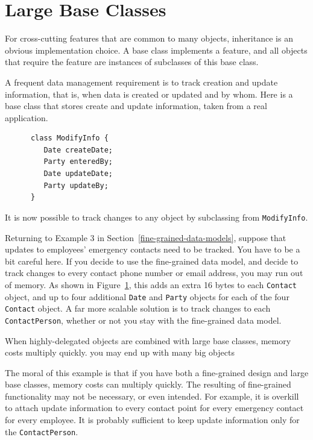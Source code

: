 \section{Large Base Classes}

For cross-cutting features that are common to many objects, inheritance is an obvious implementation choice. A base class implements a feature, and all objects that require the feature are instances of subclasses of this base class. 

\begin{example} 

A frequent data management requirement is to track creation and update information, that is, when data is created or updated and by whom.  Here is a base class that stores create and update information, taken from a real application.  
\ttfamily
\begin{verbatim}
      class ModifyInfo {
         Date createDate;
         Party enteredBy;
         Date updateDate;
         Party updateBy;
      }
\end{verbatim}
\normalfont
It is now possible to track changes to any object by subclassing from \texttt{ModifyInfo}. 
\end{example}
Returning to Example 3 in Section~\ref{fine-grained-data-models}, suppose that updates to employees' emergency contacts need to be tracked. You have to be a bit careful here. If you decide to use the fine-grained data model, and decide to track changes to every contact phone number or email address, you may run out of memory. As shown in Figure~\ref{}, this adds an extra 16 bytes to each \texttt{Contact} object, and up to four additional \texttt{Date} and \texttt{Party} objects for each of the four \texttt{Contact} object. A far more scalable solution is to track changes to each \texttt{ContactPerson}, whether or not you stay with the fine-grained data model. 

When highly-delegated objects are combined with large base classes, memory costs multiply quickly. 
you may end up with many big objects


The moral of this example is that if you have both a fine-grained design and large base classes, memory costs can multiply quickly. The resulting of fine-grained functionality may not be necessary, or even intended. For example, it is overkill to attach update information to every contact point for every emergency contact for every employee. It is probably sufficient to keep update information only for the \texttt{ContactPerson}. 

